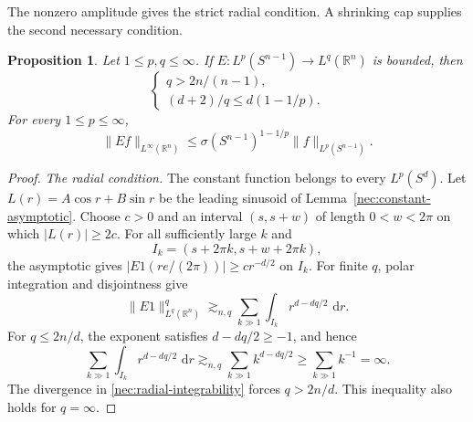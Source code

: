 \documentclass[11pt]{article}
\numberwithin{equation}{section}
\newtheorem{proposition}[theorem]{Proposition}
\newcommand{\R}{\mathbb{R}}
\newcommand{\dd}{\,\mathrm{d}}
\newcommand{\norm}[1]{\lVert #1\rVert}
\begin{document}
The nonzero amplitude gives the strict radial condition. A shrinking
cap supplies the second necessary condition.

\begin{proposition}
\label{nec:necessary}
Let \(1\le p,q\le\infty\). If
\(E:L^p(S^{n-1})\to L^q(\R^n)\) is bounded, then
\[
 \begin{cases}
 q>2n/(n-1),\\
 (d+2)/q\le d(1-1/p).
 \end{cases}
\]
For every \(1\le p\le\infty\),
\[
 \norm{Ef}_{L^\infty(\R^n)}
 \le \sigma(S^{n-1})^{1-1/p}\norm f_{L^p(S^{n-1})}.
\]
\end{proposition}

\begin{proof}
\emph{The radial condition.}
The constant function belongs to every \(L^p(S^d)\).
Let \(L(r)=A\cos r+B\sin r\) be the leading sinusoid of
Lemma~\ref{nec:constant-asymptotic}. Choose \(c>0\) and an interval
\((s,s+w)\) of length \(0<w<2\pi\) on which \(|L(r)|\ge 2c\).
For all sufficiently large \(k\) and
\[
  I_k=(s+2\pi k,s+w+2\pi k),
\]
the asymptotic gives
\(|E1(re/(2\pi))|\ge c r^{-d/2}\) on \(I_k\).
For finite \(q\), polar integration and disjointness give
\begin{equation}\label{nec:radial-integrability}
 \norm{E1}_{L^q(\R^n)}^q
 \gtrsim_{n,q}\sum_{k\gg1}\int_{I_k}r^{d-dq/2}\,\dd r.
\end{equation}
For \(q\le2n/d\), the exponent satisfies \(d-dq/2\ge-1\), and hence
\[
 \sum_{k\gg1}\int_{I_k}r^{d-dq/2}\,\dd r
 \gtrsim_{n,q}\sum_{k\gg1}k^{d-dq/2}
 \ge\sum_{k\gg1}k^{-1}=\infty.
\]
The divergence in \eqref{nec:radial-integrability} forces \(q>2n/d\). This inequality also holds for
\(q=\infty\).


\end{proof}
\end{document}

